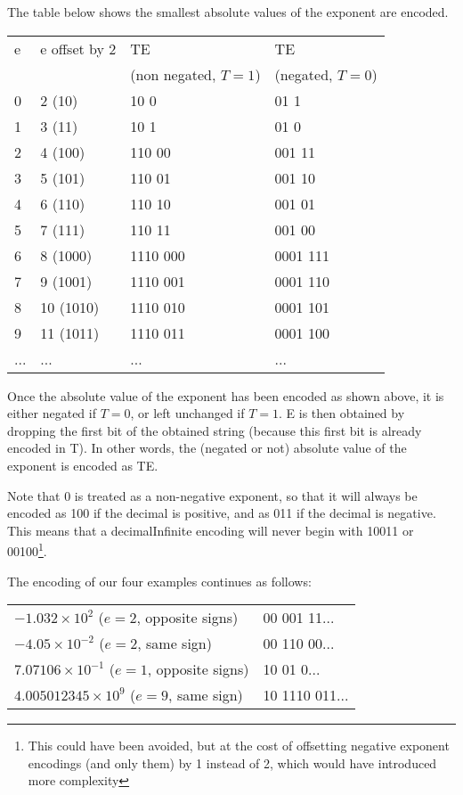 \documentclass[final,leqno,onefignum,onetabnum]{siamltex1213}
\begin{document}
The table below shows the smallest absolute values of the exponent are encoded.


\begin{tabular}{|l|l|l|l|}
\hline
e & e offset by 2 & TE & TE\\
  &  & (non negated, $T=1$) & (negated, $T=0$)\\
\hline
0 & 2 (10) & 10 0 & 01 1  \\
\hline
1 & 3 (11) & 10 1  & 01 0\\
\hline
2 & 4 (100) & 110 00  & 001 11\\
\hline
3 & 5 (101) & 110 01 & 001 10\\
\hline
4 & 6 (110) & 110 10 & 001 01\\
\hline
5 & 7 (111) & 110 11 & 001 00\\
\hline
6 & 8 (1000) & 1110 000 & 0001 111\\
\hline
7 & 9 (1001) & 1110 001 & 0001 110\\
\hline
8 & 10 (1010) & 1110 010 & 0001 101\\
\hline
9 & 11 (1011) & 1110 011 & 0001 100\\
\hline
... & ... & ...& ...\\
\hline
\end{tabular}



Once the absolute value of the exponent has been encoded as shown above, it is either negated if $T=0$, or left unchanged if $T=1$. E is then obtained by dropping the first bit of the obtained string (because this first bit is already encoded in T). In other words, the (negated or not) absolute value of the exponent is encoded as TE.

Note that 0 is treated as a non-negative exponent, so that it will always be encoded as 100 if the decimal is positive, and as 011 if the decimal is negative. This means that a decimalInfinite encoding will never begin with 10011 or 00100\footnote{This could have been avoided, but at the cost of offsetting negative exponent encodings (and only them) by 1 instead of 2, which would have introduced more complexity}.

The encoding of our four examples continues as follows:

\begin{tabular}{l|l}
$- 1.032 \times 10^2$ ($e=2$, opposite signs) & 00 001 11... \\

$-4.05 \times 10^{-2}$ ($e=2$, same sign) & 00 110 00... \\

$7.07106 \times 10^{-1}$ ($e=1$, opposite signs) & 10 01 0... \\

$4.005012345 \times 10^9$ ($e=9$, same sign) & 10 1110 011...\\
\end{tabular}
\end{document}
